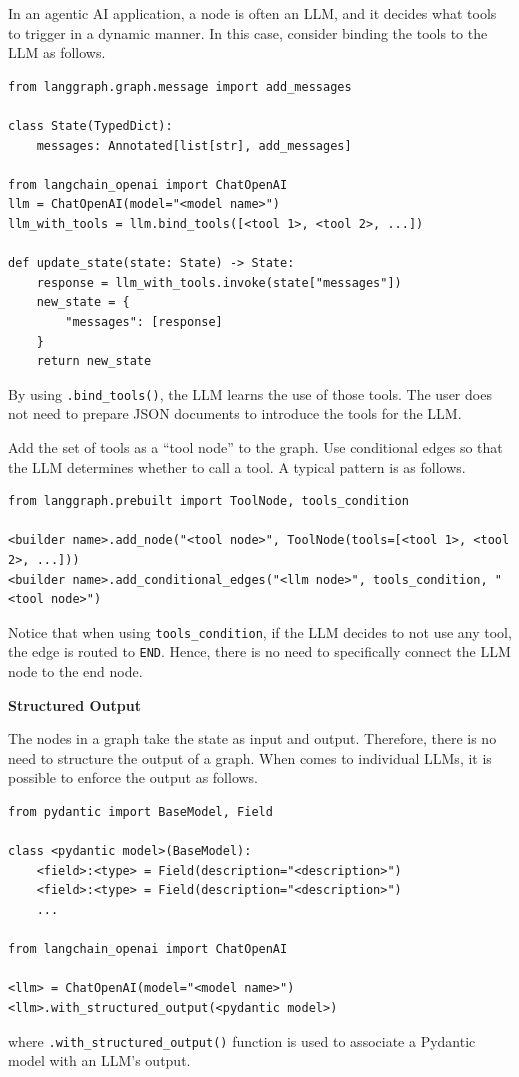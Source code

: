 In an agentic AI application, a node is often an LLM, and it decides what tools to trigger in a dynamic manner. In this case, consider binding the tools to the LLM as follows.
\begin{lstlisting}
from langgraph.graph.message import add_messages

class State(TypedDict):
    messages: Annotated[list[str], add_messages]
    
from langchain_openai import ChatOpenAI
llm = ChatOpenAI(model="<model name>")
llm_with_tools = llm.bind_tools([<tool 1>, <tool 2>, ...])

def update_state(state: State) -> State:
    response = llm_with_tools.invoke(state["messages"])
    new_state = {
        "messages": [response]
    }
    return new_state
\end{lstlisting}
By using \verb|.bind_tools()|, the LLM learns the use of those tools. The user does not need to prepare JSON documents to introduce the tools for the LLM.

Add the set of tools as a ``tool node'' to the graph. Use conditional edges so that the LLM determines whether to call a tool. A typical pattern is as follows.
\begin{lstlisting}
from langgraph.prebuilt import ToolNode, tools_condition

<builder name>.add_node("<tool node>", ToolNode(tools=[<tool 1>, <tool 2>, ...]))
<builder name>.add_conditional_edges("<llm node>", tools_condition, "<tool node>")
\end{lstlisting}
Notice that when using \verb|tools_condition|, if the LLM decides to not use any tool, the edge is routed to \verb|END|. Hence, there is no need to specifically connect the LLM node to the end node.

\vspace{0.1in}
\noindent \textbf{Structured Output}
\vspace{0.1in}

The nodes in a graph take the state as input and output. Therefore, there is no need to structure the output of a graph. When comes to individual LLMs, it is possible to enforce the output as follows.
\begin{lstlisting}
from pydantic import BaseModel, Field

class <pydantic model>(BaseModel):
    <field>:<type> = Field(description="<description>")
    <field>:<type> = Field(description="<description>")
    ...

from langchain_openai import ChatOpenAI

<llm> = ChatOpenAI(model="<model name>")
<llm>.with_structured_output(<pydantic model>)
\end{lstlisting}
where \verb|.with_structured_output()| function is used to associate a Pydantic model with an LLM's output.

